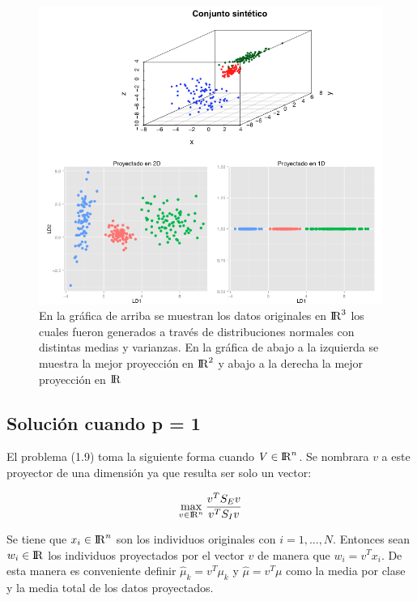 \begin{figure}[!ht]\label{Fig1.2}
  \centering
  \includegraphics[width=1\textwidth]{Figures/Chapter2_1} 
  \caption[Mejores proyecciones en ${\rm I\!R}^{2}$ y ${\rm I\!R}$.]
  {En la gráfica de arriba se muestran los datos originales en 
   ${\rm I\!R}^{3}$ los cuales fueron generados a través de distribuciones normales con distintas medias y varianzas. En la gráfica de abajo a la izquierda se muestra la mejor proyección en ${\rm I\!R}^{2}$ y abajo a la derecha la mejor proyección en ${\rm I\!R}$}
\end{figure}

\subsection{Solución cuando p = 1}

El problema (1.9) toma la siguiente forma cuando $V \in {\rm I\!R}^{n}$. Se nombrara $v$ a este proyector de una dimensión ya que resulta ser solo un vector:


\begin{equation} \label{eq:2.9}
\max_{v \in {\rm I\!R}^{n}} \frac{v^T S_E v}{v^T S_I v}  
\end{equation}

Se tiene que $x_i \in {\rm I\!R}^{n}$ son los individuos originales con $i = 1 , ... , N $. Entonces sean $w_i \in {\rm I\!R}$ los individuos proyectados por el vector $v$ de manera que $w_i = v^Tx_i$. De esta manera es conveniente definir $\widehat{\mu}_k = v^T \mu_k$ y $\widehat{\mu} = v^T \mu$ como la media por clase y la media total de los datos proyectados.

